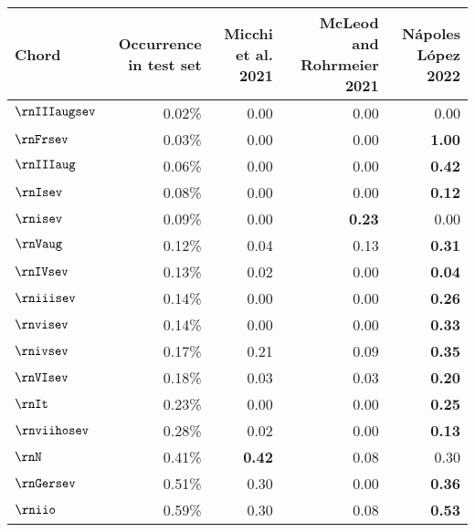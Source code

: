 \begin{tabular}{l|rrrr}
Chord & Occurrence in test set & Micchi et al. 2021 & McLeod and Rohrmeier 2021 & Nápoles López 2022 \\
\hline
$\rnIIIaugsev$ & 0.02\%                 & 0.00                 & 0.00                        & 0.00           \\
$\rnFrsev$     & 0.03\%                 & 0.00                 & 0.00                        & \textbf{1.00}  \\
$\rnIIIaug$    & 0.06\%                 & 0.00                 & 0.00                        & \textbf{0.42}  \\
$\rnIsev$      & 0.08\%                 & 0.00                 & 0.00                        & \textbf{0.12}  \\
$\rnisev$      & 0.09\%                 & 0.00                 & \textbf{0.23}               & 0.00           \\
$\rnVaug$      & 0.12\%                 & 0.04                 & 0.13                        & \textbf{0.31}  \\
$\rnIVsev$     & 0.13\%                 & 0.02                 & 0.00                        & \textbf{0.04}  \\
$\rniiisev$    & 0.14\%                 & 0.00                 & 0.00                        & \textbf{0.26}  \\
$\rnvisev$     & 0.14\%                 & 0.00                 & 0.00                        & \textbf{0.33}  \\
$\rnivsev$     & 0.17\%                 & 0.21                 & 0.09                        & \textbf{0.35}  \\
$\rnVIsev$     & 0.18\%                 & 0.03                 & 0.03                        & \textbf{0.20}  \\
$\rnIt$        & 0.23\%                 & 0.00                 & 0.00                        & \textbf{0.25}  \\
$\rnviihosev$  & 0.28\%                 & 0.02                 & 0.00                        & \textbf{0.13}  \\
$\rnN$         & 0.41\%                 & \textbf{0.42}        & 0.08                        & 0.30           \\
$\rnGersev$    & 0.51\%                 & 0.30                 & 0.00                        & \textbf{0.36}  \\
$\rniio$       & 0.59\%                 & 0.30                 & 0.08                        & \textbf{0.53}  \\

\end{tabular}
